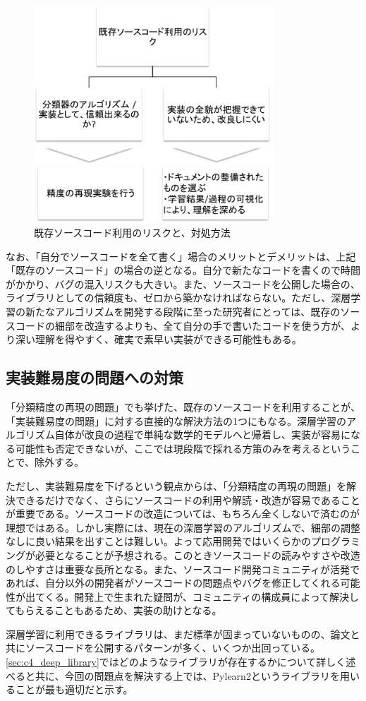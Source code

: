 \begin{figure}[tbp]
 \begin{center}
  \includegraphics[width=90mm]{img/c4/library_hedge}
 \end{center}
 \caption{既存ソースコード利用のリスクと、対処方法}
 \label{c4_library_hedge}
\end{figure}
なお、「自分でソースコードを全て書く」場合のメリットとデメリットは、上記「既存のソースコード」の場合の逆となる。自分で新たなコードを書くので時間がかかり、バグの混入リスクも大きい。また、ソースコードを公開した場合の、ライブラリとしての信頼度も、ゼロから築かなければならない。ただし、深層学習の新たなアルゴリズムを開発する段階に至った研究者にとっては、既存のソースコードの細部を改造するよりも、全て自分の手で書いたコードを使う方が、より深い理解を得やすく、確実で素早い実装ができる可能性もある。

\subsection{実装難易度の問題への対策}
\label{subsec:c4_provision_difficulty}
「分類精度の再現の問題」でも挙げた、既存のソースコードを利用することが、「実装難易度の問題」に対する直接的な解決方法の1つにもなる。深層学習のアルゴリズム自体が改良の過程で単純な数学的モデルへと帰着し、実装が容易になる可能性も否定できないが、ここでは現段階で採れる方策のみを考えるということで、除外する。\par
ただし、実装難易度を下げるという観点からは、「分類精度の再現の問題」を解決できるだけでなく、さらにソースコードの利用や解読・改造が容易であることが重要である。ソースコードの改造については、もちろん全くしないで済むのが理想ではある。しかし実際には、現在の深層学習のアルゴリズムで、細部の調整なしに良い結果を出すことは難しい。よって応用開発ではいくらかのプログラミングが必要となることが予想される。このときソースコードの読みやすさや改造のしやすさは重要な長所となる。また、ソースコード開発コミュニティが活発であれば、自分以外の開発者がソースコードの問題点やバグを修正してくれる可能性が出てくる。開発上で生まれた疑問が、コミュニティの構成員によって解決してもらえることもあるため、実装の助けとなる。\par%
深層学習に利用できるライブラリは、まだ標準が固まっていないものの、論文と共にソースコードを公開するパターンが多く、いくつか出回っている。\ref{sec:c4_deep_library}ではどのようなライブラリが存在するかについて詳しく述べると共に、今回の問題点を解決する上では、Pylearn2というライブラリを用いることが最も適切だと示す。



